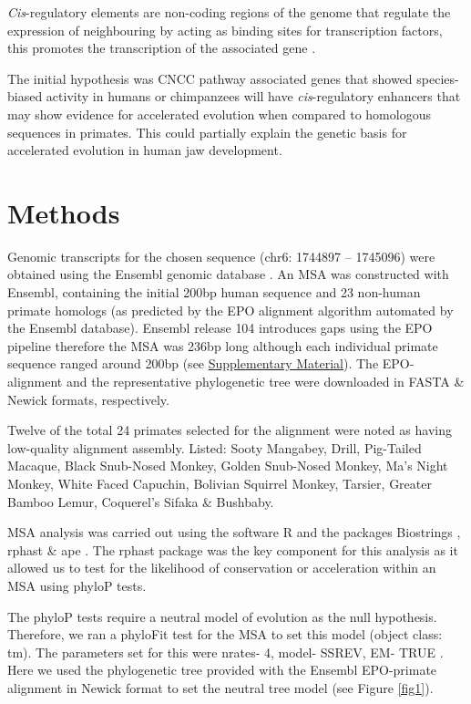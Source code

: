 \documentclass{article}[12pt]
\begin{document}
\emph{Cis}-regulatory elements are non-coding regions of the genome that regulate the expression of neighbouring by acting as binding sites for transcription factors, this promotes the transcription of the associated gene \parencite{deLeon2007, Prescott2015, Wray2007}. 

The initial hypothesis was \Gls{CNCC} pathway associated genes that showed species-biased activity in humans or chimpanzees will have \emph{cis}-regulatory enhancers that may show evidence for accelerated evolution when compared to homologous sequences in primates. This could partially explain the genetic basis for accelerated evolution in human jaw development. 

\section*{Methods}

Genomic transcripts for the chosen sequence (chr6: 1744897 – 1745096) were obtained using the Ensembl genomic database \parencite{Ensembl}. An \Gls{MSA} was constructed with Ensembl, containing the initial 200bp human sequence and 23 non-human primate homologs (as predicted by the \Gls{EPO} alignment algorithm automated by the Ensembl database). Ensembl release 104 introduces gaps using the EPO pipeline therefore the MSA was 236bp long although each individual primate sequence ranged around 200bp (see \hyperref[sec:supp]{Supplementary Material}). The EPO-alignment and the representative phylogenetic tree were downloaded in FASTA \& Newick formats, respectively.

Twelve of the total 24 primates selected for the alignment were noted as having low-quality alignment assembly. Listed: Sooty Mangabey, Drill, Pig-Tailed Macaque, Black Snub-Nosed Monkey, Golden Snub-Nosed Monkey, Ma’s Night Monkey, White Faced Capuchin, Bolivian Squirrel Monkey, Tarsier, Greater Bamboo Lemur, Coquerel’s Sifaka \& Bushbaby.

MSA analysis was carried out using the software R \parencite{R} and the packages Biostrings \parencite{Biostrings}, rphast \parencite{Rphast} \& ape \parencite{Ape}. The rphast package was the key component for this analysis as it allowed us to test for the likelihood of conservation or acceleration within an MSA using phyloP tests.

The phyloP tests require a neutral model of evolution as the null hypothesis. Therefore, we ran a phyloFit test for the MSA to set this model (object class: tm). The parameters set for this were nrates- 4, model- SSREV, EM- TRUE \parencite{Gittelman2015}. Here we used the phylogenetic tree provided with the Ensembl EPO-primate alignment in Newick format to set the neutral tree model (see Figure \ref{fig1}).
\end{document}
